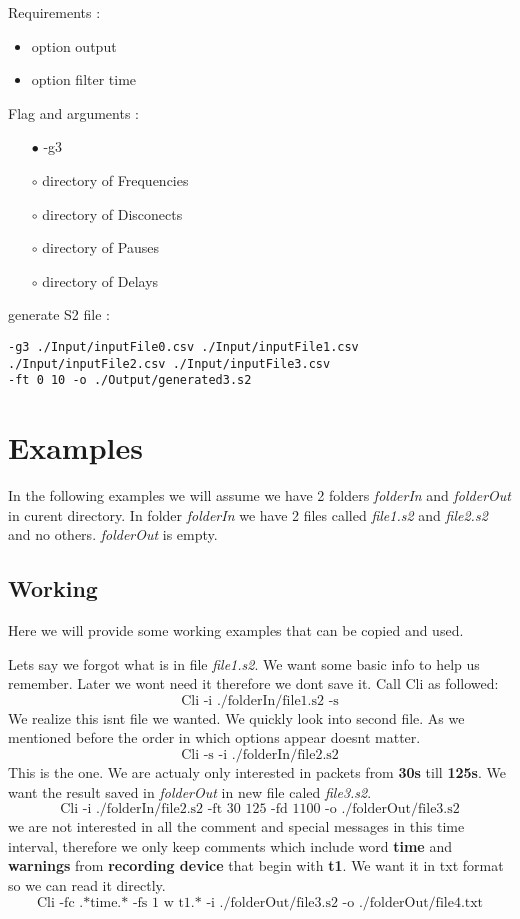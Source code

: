 \documentclass[english]{article}
\begin{document}
\noindent Requirements : 
\begin{itemize}
\item option output
\item option filter time
\end{itemize}
Flag and arguments :

\begin{itemize}
\item[$\bullet$] -g3
\item[$\circ$] directory of Frequencies
\item[$\circ$] directory of Disconects
\item[$\circ$] directory of Pauses
\item[$\circ$] directory of Delays


\end{itemize}
generate S2 file : 
\begin{lstlisting} 
-g3 ./Input/inputFile0.csv ./Input/inputFile1.csv
./Input/inputFile2.csv ./Input/inputFile3.csv 
-ft 0 10 -o ./Output/generated3.s2
\end{lstlisting}

\section{Examples}

In the following examples we will assume we have 2 folders \textit{folderIn} and \textit{folderOut} in curent directory. In folder \textit{folderIn} we have 2 files called \textit{file1.s2} and \textit{file2.s2} and no others. \textit{folderOut} is empty.

\subsection{Working}
Here we will provide some working examples that can be copied and used. 

Lets say we forgot what is in file \textit{file1.s2}. We want some basic info to help us remember. Later we wont need it therefore we dont save it. Call Cli as followed:
$$\text{Cli -i ./folderIn/file1.s2 -s}$$
We realize this isnt file we wanted. We quickly look into second file. As we mentioned before the order in which options appear doesnt matter.
$$\text{Cli -s -i ./folderIn/file2.s2}$$
This is the one. We are actualy only interested in packets from \textbf{30s} till \textbf{125s}. We want the result saved in \textit{folderOut} in new file caled \textit{file3.s2}.
$$\text{Cli -i ./folderIn/file2.s2 -ft 30 125 -fd 1100 -o ./folderOut/file3.s2}$$
we are not interested in all the comment and special messages in this time interval, therefore we only keep comments which include word \textbf{time} and \textbf{warnings} from \textbf{recording device} that begin with \textbf{t1}. We want it in txt format so we can read it directly.
$$\text{Cli -fc .*time.* -fs 1 w t1.* -i ./folderOut/file3.s2 -o ./folderOut/file4.txt}$$
\end{document}
